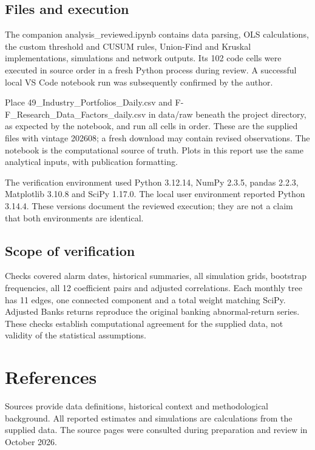 \documentclass[11pt,a4paper]{article}
\begin{document}
\subsection*{Files and execution}
The companion analysis\_reviewed.ipynb contains data parsing, \mbox{OLS} calculations, the custom threshold and CUSUM rules, Union-Find and Kruskal implementations, simulations and network outputs. Its 102 code cells were executed in source order in a fresh Python process during review. A successful local VS Code notebook run was subsequently confirmed by the author.

Place 49\_Industry\_Portfolios\_Daily.csv and F-F\_Research\_Data\_Factors\_daily.csv in data/raw beneath the project directory, as expected by the notebook, and run all cells in order. These are the supplied files with vintage 202608; a fresh download may contain revised observations. The notebook is the computational source of truth. Plots in this report use the same analytical inputs, with publication formatting.

The verification environment used Python 3.12.14, NumPy 2.3.5, pandas 2.2.3, Matplotlib 3.10.8 and SciPy 1.17.0. The local user environment reported Python 3.14.4. These versions document the reviewed execution; they are not a claim that both environments are identical.

\subsection*{Scope of verification}
Checks covered alarm dates, historical summaries, all simulation grids, bootstrap frequencies, all 12 coefficient pairs and adjusted correlations. Each monthly tree has 11 edges, one connected component and a total weight matching SciPy. Adjusted Banks returns reproduce the original banking abnormal-return series. These checks establish computational agreement for the supplied data, not validity of the statistical assumptions.

\clearpage
\section*{References}
Sources provide data definitions, historical context and methodological background. All reported estimates and simulations are calculations from the supplied data. The source pages were consulted during preparation and review in October 2026.
\end{document}
